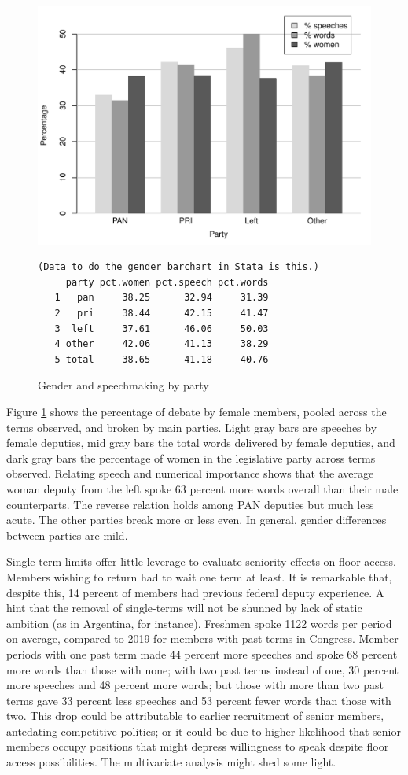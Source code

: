 \documentclass[letter,12pt]{article}
\begin{document}
\begin{figure}
  \centering
    \includegraphics[width=.67\columnwidth]{../plots/women-bar.pdf}
\singlespacing
\begin{scriptsize}
\begin{verbatim}
(Data to do the gender barchart in Stata is this.)
     party pct.women pct.speech pct.words
   1   pan     38.25      32.94     31.39
   2   pri     38.44      42.15     41.47
   3  left     37.61      46.06     50.03
   4 other     42.06      41.13     38.29
   5 total     38.65      41.18     40.76
\end{verbatim}
\end{scriptsize}
\doublespacing
    \caption{Gender and speechmaking by party}\label{F:women}
\end{figure}

Figure \ref{F:women} shows the percentage of debate by female members, pooled across the terms observed, and broken by main parties. Light gray bars are speeches by female deputies, mid gray bars the total words delivered by female deputies, and dark gray bars the percentage of women in the legislative party across terms observed. Relating speech and numerical importance shows that the average woman deputy from the left spoke 63 percent more words overall than their male counterparts. The reverse relation holds among PAN deputies but much less acute. The other parties break more or less even. In general, gender differences between parties are mild. 

Single-term limits offer little leverage to evaluate seniority effects on floor access. Members wishing to return had to wait one term at least. It is remarkable that, despite this, 14 percent of members had previous federal deputy experience. A hint that the removal of single-terms will not be shunned by lack of static ambition (as in Argentina, for instance). Freshmen spoke 1122 words per period on average, compared to 2019 for members with past terms in Congress. Member-periods with one past term made 44 percent more speeches and spoke 68 percent more words than those with none; with two past terms instead of one, 30 percent more speeches and 48 percent more words; but those with more than two past terms gave 33 percent less speeches and 53 percent fewer words than those with two. This drop could be attributable to earlier recruitment of senior members, antedating competitive politics; or it could be due to higher likelihood that senior members occupy positions that might depress willingness to speak despite floor access possibilities. The multivariate analysis might shed some light.  
\end{document}
